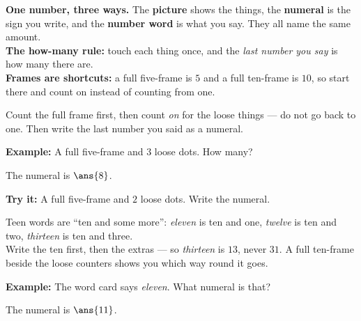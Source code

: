 \documentclass[12pt]{article}
\begin{document}

\begin{formulabox}
\textbf{One number, three ways.} The \textbf{picture} shows the things, the
\textbf{numeral} is the sign you write, and the \textbf{number word} is what
you say. They all name the same amount.\\[3pt]
\textbf{The how-many rule:} touch each thing once, and the \emph{last number
you say} is how many there are.\\[3pt]
\textbf{Frames are shortcuts:} a full five-frame is $5$ and a full ten-frame is
$10$, so start there and count on instead of counting from one.
\end{formulabox}


\begin{formulabox}
Count the full frame first, then count \emph{on} for the loose things --- do
not go back to one. Then write the last number you said as a numeral.
\end{formulabox}

\begin{examplebox}
\textbf{Example:} A full five-frame and $3$ loose dots. How many?

The numeral is $\ans{8}$.
\end{examplebox}

\begin{tryitbox}
\textbf{Try it:} A full five-frame and $2$ loose dots. Write the numeral.\\[2pt]
\end{tryitbox}


\begin{formulabox}
Teen words are ``ten and some more'': \emph{eleven} is ten and one,
\emph{twelve} is ten and two, \emph{thirteen} is ten and three.\\[3pt]
Write the ten first, then the extras --- so \emph{thirteen} is $13$, never
$31$. A full ten-frame beside the loose counters shows you which way round it
goes.
\end{formulabox}

\begin{examplebox}
\textbf{Example:} The word card says \emph{eleven}. What numeral is that?

The numeral is $\ans{11}$.
\end{examplebox}
\end{document}
